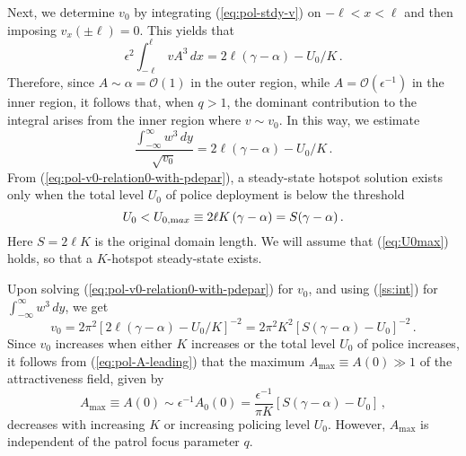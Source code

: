 \documentclass{article}%
\begin{document}
Next, we determine $v_{0}$ by integrating (\ref{eq:pol-stdy-v})
on $-\ell<x<\ell$ and then imposing $v_{x}(\pm\ell)=0$. This yields that
\[
\epsilon^{2}\int_{-\ell}^{\ell}vA^{3}\,dx=
2\ell\left(\gamma-\alpha\right)-U_{0}/K\,.
\]
Therefore, since $A\sim\alpha={\mathcal O}(1)$ in the outer region,
while $A={\mathcal O}(\epsilon^{-1})$ in the inner region, it follows
that, when $q>1$, the dominant contribution to the integral arises from
the inner region where $v\sim v_0$. In this way, we estimate
\begin{equation}
\frac{\int_{-\infty}^{\infty}w^{3}\, dy}{\sqrt{v_0}}  =  
2\ell\left(\gamma-\alpha\right)-
U_{0}/K \,. \label{eq:pol-v0-relation0-with-pdepar} 
\end{equation}
From (\ref{eq:pol-v0-relation0-with-pdepar}), a
steady-state hotspot solution exists only when the total level $U_0$ of
police deployment is below the threshold
\begin{equation}
U_{0}<U_{0,{\textrm max}}\equiv2\ell K\left(\gamma-\alpha\right) = 
S  (\gamma-\alpha) \,.
\label{eq:U0max}
\end{equation}
Here $S=2\ell K$ is the original domain length. We will
assume that (\ref{eq:U0max}) holds, so that a $K$-hotspot steady-state
exists. 

Upon solving (\ref{eq:pol-v0-relation0-with-pdepar}) for $v_0$, and
using (\ref{ss:int}) for $\int_{-\infty}^{\infty} w^3\, dy$, we get
\begin{equation}
 v_{0}  =  2\pi^{2}\left[2\ell\left(\gamma-\alpha\right)-U_{0}/K\right]^{-2}
  = 2\pi^2 K^2 \left[S(\gamma-\alpha)-U_{0}\right]^{-2}\,.
\label{eq:pol-v0-formula}
\end{equation}
Since $v_0$ increases when either $K$ increases or the total level
$U_0$ of police increases, it follows from (\ref{eq:pol-A-leading})
that the maximum $A_{\max}\equiv A(0)\gg 1$ of the attractiveness field, given by
\begin{equation}\label{eq:amax}
    A_{\max}\equiv A(0) \sim \epsilon^{-1} A_{0}(0) = \frac{\epsilon^{-1}}{\pi K} 
   \left[S(\gamma-\alpha)-U_0\right] \,,
\end{equation}
decreases with increasing $K$ or increasing policing level
$U_0$. However, $A_{\max}$ is independent of the patrol
focus parameter $q$.
\end{document}

